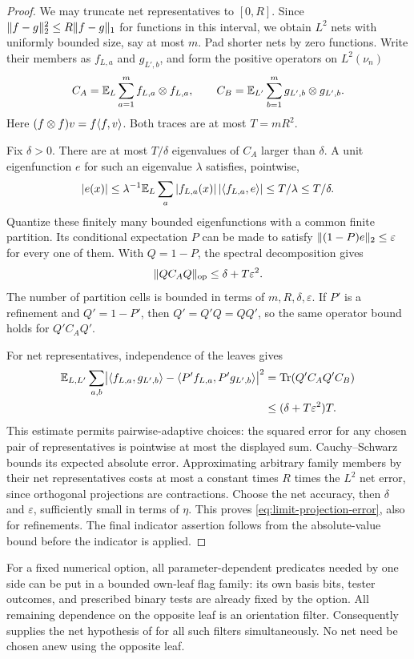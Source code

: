 \begin{proof}
We may truncate net representatives to $[0,R]$. Since
$\lVert f-g\rVert_2^2\le R\lVert f-g\rVert_1$ for functions in this interval,
we obtain $L^2$ nets with uniformly bounded size, say at most $m$.
Pad shorter nets by zero functions. Write their members as $f_{L,a}$
and $g_{L',b}$, and form the positive operators on $L^2(\nu_n)$
\[
C_A=\mathbb E_L\sum_{a=1}^m f_{L,a}\otimes f_{L,a},\qquad
C_B=\mathbb E_{L'}\sum_{b=1}^m g_{L',b}\otimes g_{L',b}.
\]
Here $(f\otimes f)v=f\langle f,v\rangle$. Both traces are at most
$T=mR^2$.

Fix $\delta>0$. There are at most $T/\delta$ eigenvalues of $C_A$
larger than $\delta$. A unit eigenfunction $e$ for such an eigenvalue
$\lambda$ satisfies, pointwise,
\[
|e(x)|
\le\lambda^{-1}\mathbb E_L\sum_a |f_{L,a}(x)|\,
  |\langle f_{L,a},e\rangle|
\le T/\lambda\le T/\delta.
\]
Quantize these finitely many bounded eigenfunctions with a common finite
partition. Its conditional expectation $P$ can be made to satisfy
$\lVert (1-P)e\rVert_2\le\varepsilon$ for every one of them. With $Q=1-P$,
the spectral decomposition gives
\[
\lVert Q C_A Q\rVert_{\mathrm{op}}
\le\delta+T\varepsilon^2.
\]
The number of partition cells is bounded in terms of
$m,R,\delta,\varepsilon$. If $P'$ is a refinement and $Q'=1-P'$,
then $Q'=Q'Q=QQ'$, so the same operator bound holds for
$Q'C_AQ'$.

For net representatives, independence of the leaves gives
\begin{align*}
\mathbb E_{L,L'}\sum_{a,b}
 \bigl|\langle f_{L,a},g_{L',b}\rangle-
       \langle P'f_{L,a},P'g_{L',b}\rangle\bigr|^2
&=\operatorname{Tr}(Q'C_AQ'C_B)\\
&\le(\delta+T\varepsilon^2)T.
\end{align*}
This estimate permits pairwise-adaptive choices: the squared error for
any chosen pair of representatives is pointwise at most the displayed
sum. Cauchy--Schwarz bounds its expected absolute error. Approximating
arbitrary family members by their net representatives costs at most a
constant times $R$ times the $L^2$ net error, since orthogonal
projections are contractions. Choose the net accuracy, then $\delta$
and $\varepsilon$, sufficiently small in terms of $\eta$. This proves
\eqref{eq:limit-projection-error}, also for refinements. The final
indicator assertion follows from the absolute-value bound before the
indicator is applied.
\end{proof}

For a fixed numerical option, all parameter-dependent predicates needed
by one side can be put in a bounded own-leaf flag family: its own basis
bits, tester outcomes, and prescribed binary tests are already fixed by
the option. All remaining dependence on the opposite leaf is an
orientation filter. Consequently  supplies
the net hypothesis of  for all such
filters simultaneously. No net need be chosen anew using the opposite
leaf.

